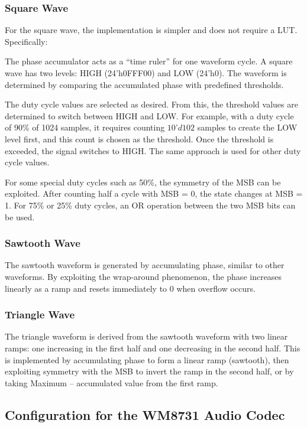 \subsubsection{Square Wave}

For the square wave, the implementation is simpler and does not require a LUT. Specifically:

The phase accumulator acts as a “time ruler” for one waveform cycle. A square wave has two levels: HIGH (24'h0FFF00) and LOW (24'h0). The waveform is determined by comparing the accumulated phase with predefined thresholds.

The duty cycle values are selected as desired. From this, the threshold values are determined to switch between HIGH and LOW. For example, with a duty cycle of 90\% of 1024 samples, it requires counting $10’d102$ samples to create the LOW level first, and this count is chosen as the threshold. Once the threshold is exceeded, the signal switches to HIGH. The same approach is used for other duty cycle values.

For some special duty cycles such as 50\%, the symmetry of the MSB can be exploited. After counting half a cycle with MSB = 0, the state changes at MSB = 1. For 75\% or 25\% duty cycles, an OR operation between the two MSB bits can be used.

\subsubsection{Sawtooth Wave}

The sawtooth waveform is generated by accumulating phase, similar to other waveforms. By exploiting the wrap-around phenomenon, the phase increases linearly as a ramp and resets immediately to 0 when overflow occurs.

\subsubsection{Triangle Wave}

The triangle waveform is derived from the sawtooth waveform with two linear ramps: one increasing in the first half and one decreasing in the second half. This is implemented by accumulating phase to form a linear ramp (sawtooth), then exploiting symmetry with the MSB to invert the ramp in the second half, or by taking Maximum – accumulated value from the first ramp.

\subsection{Configuration for the WM8731 Audio Codec}
